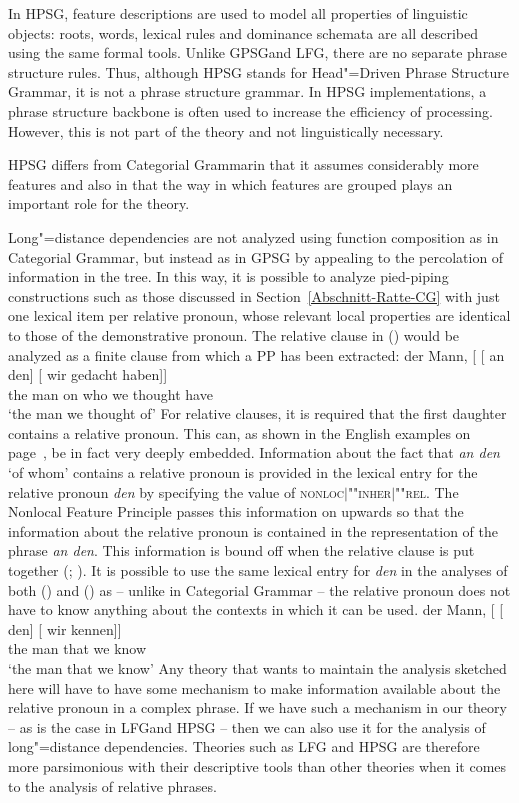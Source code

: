In HPSG, feature descriptions are used to model all properties of linguistic objects: roots, words, lexical rules and dominance schemata are
all described using the same formal tools. Unlike GPSG\indexgpsg and LFG\indexlfg, there are no separate phrase structure rules. Thus, although
HPSG stands for Head"=Driven Phrase Structure Grammar, it is not a phrase structure grammar. In HPSG implementations, a phrase structure backbone
is often used to increase the efficiency of processing. However, this is not part of the theory and not linguistically necessary.

HPSG differs from Categorial Grammar\indexcg in that it assumes considerably more features and also in that the way in which features are grouped plays
an important role for the theory.

Long"=distance dependencies are not analyzed using function composition as in Categorial Grammar, but instead
as in GPSG by appealing to the percolation of information in the tree. In this way, it is possible to analyze pied-piping constructions such as those
discussed in Section~\ref{Abschnitt-Ratte-CG} with just one lexical item per relative pronoun, whose relevant local properties are identical to those of the
demonstrative pronoun. The relative clause in () would be analyzed as a finite clause from which a PP has been extracted:
\ea
\gll der Mann, [ [ an den] [ wir gedacht haben]]\\
     the man   {}        {}        on who  {}          we  thought have\\
\glt `the man we thought of'
\z
For relative clauses, it is required that the first daughter contains a relative pronoun. This can, as shown in the English examples on page~\pageref{Beispiel-Minister},
be in fact very deeply embedded. Information about the fact that \emph{an den} `of whom' contains a relative pronoun is provided in the lexical entry for the relative
pronoun \emph{den} by specifying the value of \textsc{nonloc$|$""inher$|$""rel}.
The Nonlocal Feature Principle passes this information on upwards so that the information about the relative pronoun is contained in the representation
of the phrase \emph{an den}. This information is bound off when the relative clause is put together (\citealp[Chapter~5]{ps2}; \citealp{Sag97a}).
It is possible to use the same lexical entry for \emph{den} in the analyses of both () and
() as -- unlike in Categorial Grammar -- the relative pronoun does not have to know anything about the contexts in which it can be used.
\ea
\gll der Mann, [ [ den] [ wir kennen]]\\
	 the man {} {} that {} we know\\
\glt `the man that we know'
\z
Any theory that wants to maintain the analysis sketched here will have to have some mechanism to make information available about the relative pronoun
in a complex phrase. If we have such a mechanism in our theory -- as is the case in LFG\indexlfg and HPSG -- then we can also use it for the analysis
of long"=distance dependencies. Theories such as LFG and HPSG are therefore more parsimonious with their descriptive tools than other theories when it comes to
the analysis of relative phrases.

